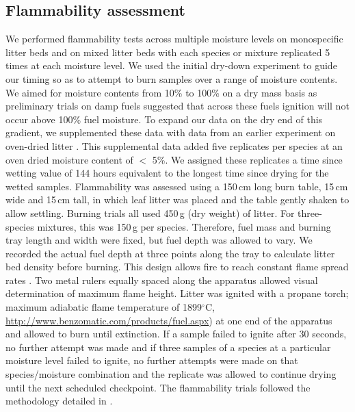 \documentclass[letterpaper,12pt]{article}
\begin{document}
\subsection*{Flammability assessment}

We performed flammability tests across multiple moisture levels on monospecific
litter beds and on mixed litter beds with each species or mixture replicated 5
times at each moisture level. We used the initial dry-down experiment to guide
our timing so as to attempt to burn samples over a range of moisture contents.
We aimed for moisture contents from 10\% to 100\% on a dry mass basis as
preliminary trials on damp fuels suggested that across these fuels ignition
will not occur above 100\% fuel moisture. To expand our data on the dry end of
this gradient, we supplemented these data with data from an earlier experiment
on oven-dried litter \citep{Magalhaes+Schwilk-2012}. This supplemental data
added five replicates per species at an oven dried moisture content of $<$ 5\%.
We assigned these replicates a time since wetting value of 144 hours equivalent
to the longest time since drying for the wetted samples. Flammability was
assessed using a 150\,cm long burn table, 15\,cm wide and 15\,cm tall, in which
leaf litter was placed and the table gently shaken to allow settling. Burning
trials all used 450\,g (dry weight) of litter. For three-species mixtures, this
was 150\,g per species. Therefore, fuel mass and burning tray length and width
were fixed, but fuel depth was allowed to vary. We recorded the actual fuel
depth at three points along the tray to calculate litter bed density before
burning. This design allows fire to reach constant flame spread rates
\citep{Magalhaes+Schwilk-2012}. Two metal rulers equally spaced along the
apparatus allowed visual determination of maximum flame height. Litter was
ignited with a propane torch; maximum adiabatic flame temperature of
1899$^\circ$C, \url{http://www.benzomatic.com/products/fuel.aspx}) at one end
of the apparatus and allowed to burn until extinction. If a sample failed to
ignite after 30 seconds, no further attempt was made and if three samples of a
species at a particular moisture level failed to ignite, no further attempts
were made on that species/moisture combination and the replicate was allowed to
continue drying until the next scheduled checkpoint. The flammability
trials followed the methodology detailed in \citet{Magalhaes+Schwilk-2012}.
 
\end{document}

